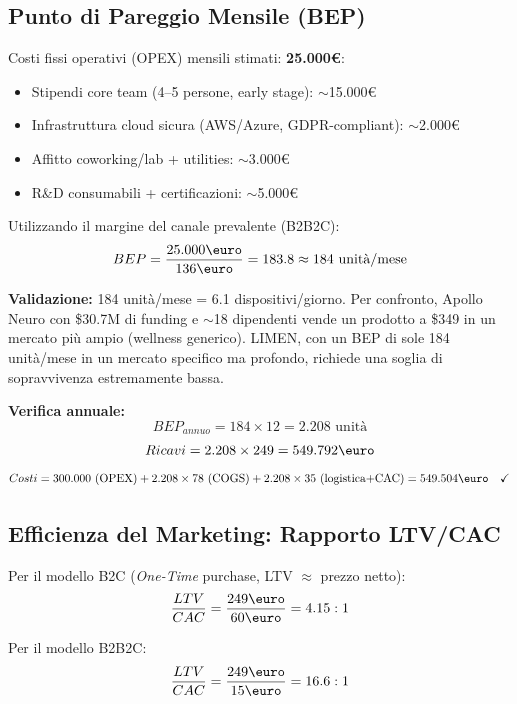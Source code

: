\documentclass[12pt,a4paper]{article}
\begin{document}
\subsection{Punto di Pareggio Mensile (BEP)}
Costi fissi operativi (OPEX) mensili stimati: \textbf{25.000\euro}:
\begin{itemize}
    \item Stipendi core team (4--5 persone, early stage): $\sim$15.000\euro
    \item Infrastruttura cloud sicura (AWS/Azure, GDPR-compliant): $\sim$2.000\euro
    \item Affitto coworking/lab + utilities: $\sim$3.000\euro
    \item R\&D consumabili + certificazioni: $\sim$5.000\euro
\end{itemize}

Utilizzando il margine del canale prevalente (B2B2C):
\begin{equation}
    BEP = \frac{25.000\text{\euro}}{136\text{\euro}} = 183.8 \approx 184 \text{ unità/mese}
\end{equation}

\textbf{Validazione:} 184 unità/mese = 6.1 dispositivi/giorno. Per confronto, Apollo Neuro con \$30.7M di funding e $\sim$18 dipendenti vende un prodotto a \$349 in un mercato più ampio (wellness generico). LIMEN, con un BEP di sole 184 unità/mese in un mercato specifico ma profondo, richiede una soglia di sopravvivenza estremamente bassa.

\textbf{Verifica annuale:}
$$BEP_{annuo} = 184 \times 12 = 2.208 \text{ unità}$$
$$Ricavi = 2.208 \times 249 = 549.792\text{\euro}$$
$$Costi = 300.000\text{ (OPEX)} + 2.208 \times 78\text{ (COGS)} + 2.208 \times 35\text{ (logistica+CAC)} = 549.504\text{\euro} \quad \checkmark$$

\subsection{Efficienza del Marketing: Rapporto LTV/CAC}
Per il modello B2C (\textit{One-Time} purchase, LTV $\approx$ prezzo netto):
\begin{equation}
    \frac{LTV}{CAC} = \frac{249\text{\euro}}{60\text{\euro}} = 4.15 : 1
\end{equation}

Per il modello B2B2C:
\begin{equation}
    \frac{LTV}{CAC} = \frac{249\text{\euro}}{15\text{\euro}} = 16.6 : 1
\end{equation}
\end{document}
